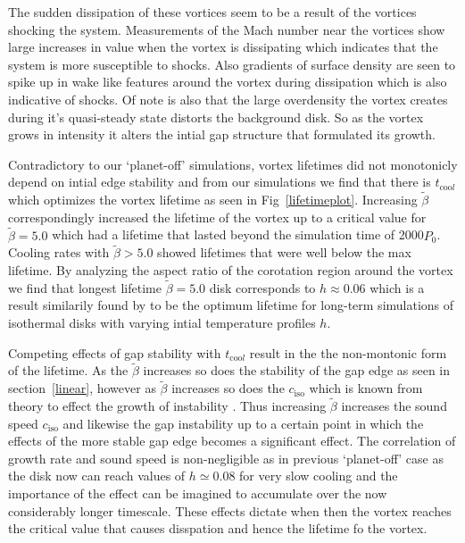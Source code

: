The sudden dissipation of these vortices seem to be a result of the vortices shocking the system. Measurements of the Mach number near the vortices show large increases in value when the vortex is dissipating which indicates that the system is more susceptible to shocks. Also gradients of surface density are seen to spike up in wake like features around the vortex during dissipation which is also indicative of shocks. Of note is also that the large overdensity the vortex creates during it's quasi-steady state distorts the background disk. So as the vortex grows in intensity it alters the intial gap structure that formulated its growth.

Contradictory to our `planet-off' simulations, vortex lifetimes did not monotonicly depend on intial edge stability and from our simulations we find that there is $t_{\mathrm{coo}l}$ which optimizes the vortex lifetime as seen in Fig~\ref{lifetimeplot}. Increasing $\tilde\beta$ correspondingly increased the lifetime of the vortex up to a critical value for $\tilde{\beta}=5.0$ which had a lifetime that lasted beyond the simulation time of 2000$P_0$. Cooling rates with $\tilde\beta>5.0$ showed lifetimes that were well below the max lifetime. By analyzing the aspect ratio of the corotation region around the vortex we find that longest lifetime $\tilde\beta=5.0$ disk corresponds to $h\approx0.06$ which is a result similarily found by \citet{fu14} to be the optimum lifetime for long-term simulations of isothermal disks with varying intial temperature profiles $h$.

Competing effects of gap stability with $t_{\mathrm{coo}l}$ result in the the non-montonic form of the lifetime. As the $\tilde\beta$ increases so does the stability of the gap edge as seen in section~\ref{linear}, however as $\tilde\beta$ increases so does the $c_{\mathrm{iso}}$ which is known from theory to effect the growth of instability \citep{li00}. Thus increasing $\tilde\beta$ increases the sound speed $c_{\mathrm{iso}}$ and likewise the gap instability up to a certain point in which the effects of the more stable gap edge becomes a significant effect. The correlation of growth rate and sound speed is non-negligible as in previous `planet-off' case as the disk now can reach values of $h\simeq0.08$ for very slow cooling and the importance of the effect can be imagined to accumulate over the now considerably longer timescale. These effects dictate when then the vortex reaches the critical value that causes disspation and hence the lifetime fo the vortex.

